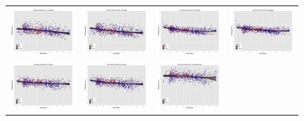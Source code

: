 \begin{figure}
  \centering
  \begin{tabular}{cccc}
  \includegraphics[width=35mm]{Figures/label1_results.pdf} &
  \includegraphics[width=35mm]{Figures/label2_results.pdf} &
  \includegraphics[width=35mm]{Figures/label3_results.pdf} &
  \includegraphics[width=35mm]{Figures/label4_results.pdf} \\
  \includegraphics[width=35mm]{Figures/label5_results.pdf} &
  \includegraphics[width=35mm]{Figures/label6_results.pdf} &
  \includegraphics[width=35mm]{Figures/label7_results.pdf} &

\end{tabular}
\end{figure}
